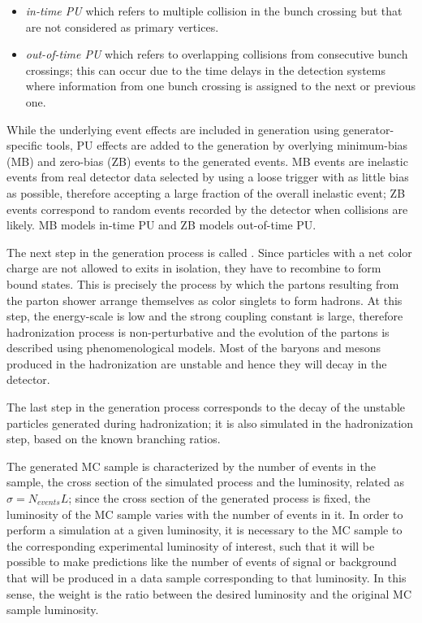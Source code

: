 \begin{itemize}
\item \textit{in-time PU} which refers to multiple \pp collision in the bunch crossing but that are not considered as primary vertices. 
\item \textit{out-of-time PU} which refers to overlapping \pp collisions from consecutive bunch crossings; this can occur due to the time delays in the detection systems where information from one bunch crossing is assigned to the next or previous one. 
\end{itemize}

While the underlying event effects are included in generation using generator-specific tools, PU effects are added to the generation by overlying minimum-bias (MB) and zero-bias (ZB) events to the generated events. MB events are inelastic events from real detector data selected by using a loose trigger with as little bias as possible, therefore accepting a large fraction of the overall inelastic event; ZB events correspond to random events recorded by the detector when collisions are likely. MB models in-time PU and ZB models out-of-time PU. 

The next step in the generation process is called . Since particles with a net color charge are not allowed to exits in isolation, they have to recombine to form bound states. This is precisely the process by which the partons resulting from the parton shower arrange themselves as color singlets to form hadrons. At this step, the energy-scale is low and the strong coupling constant is large, therefore hadronization process is non-perturbative and the evolution of the partons is described using phenomenological models. Most of the baryons and mesons produced in the hadronization are unstable and hence they will decay in the detector.

The last step in the generation process corresponds to the decay of the unstable particles generated during hadronization; it is also simulated in the hadronization step, based on the known branching ratios. 

The generated MC sample is characterized by the number of events in the sample, the cross section of the simulated process and the luminosity, related as $\sigma=N_{events}L$; since the cross section of the generated process is fixed, the luminosity of the MC sample varies with the number of events in it. In order to perform a simulation at a given luminosity, it is necessary to  the MC sample to the corresponding experimental luminosity of interest, such that it will be possible to make predictions like the number of events of signal or background that will be produced in a data sample corresponding to that luminosity. In this sense, the weight is the ratio between the desired luminosity and the original MC sample luminosity.

